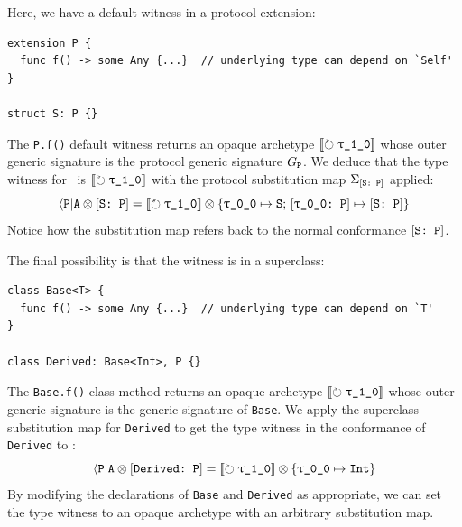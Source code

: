 \documentclass[../generics]{subfiles}
\begin{document}
\begin{example}\label{opaque type witness proto example}
Here, we have a default witness in a protocol extension:
\begin{Verbatim}
extension P {
  func f() -> some Any {...}  // underlying type can depend on `Self'
}

struct S: P {}
\end{Verbatim}
The \texttt{P.f()} default witness returns an opaque archetype $\Oy$ whose outer generic signature is the protocol generic signature $G_{\texttt{P}}$. We deduce that the type witness for \nA\ is $\Oy$ with the protocol substitution map $\Sigma_{[\texttt{S:~P}]}$ applied:
\[
\APA \otimes \ConfReq{S}{P} = \Oy \otimes \SubstMapC{\SubstType{\rT}{S}}{\SubstConf{\rT}{S}{P}}
\]
Notice how the substitution map refers back to the normal conformance $[\texttt{S:~P}]$.
\end{example}

\begin{example}\label{opaque type witness superclass example}
The final possibility is that the witness is in a superclass:
\begin{Verbatim}
class Base<T> {
  func f() -> some Any {...}  // underlying type can depend on `T'
}

class Derived: Base<Int>, P {}
\end{Verbatim}
The \texttt{Base.f()} class method returns an opaque archetype $\Oy$ whose outer generic signature is the generic signature of \texttt{Base}. We apply the superclass substitution map for \texttt{Derived} to get the type witness in the conformance of \texttt{Derived} to \tP:
\[
\APA \otimes \ConfReq{Derived}{P} = \Oy \otimes \SubstMap{\SubstType{\rT}{Int}}
\]
By modifying the declarations of \texttt{Base} and \texttt{Derived} as appropriate, we can set the type witness to an opaque archetype with an arbitrary substitution map.
\end{example}
\end{document}
